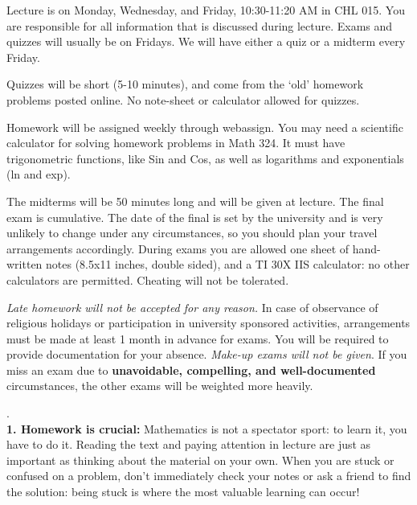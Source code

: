 \documentclass[11 pt]{report}
\begin{document}
\vspace{0.25cm}

  Lecture is on Monday, Wednesday, and Friday, 10:30-11:20 AM in CHL 015.  You
are responsible for all information that is discussed
during lecture. Exams and quizzes will usually be on Fridays. We will have either a quiz or a midterm every Friday. 
\vspace{0.25cm}

 Quizzes will be short (5-10 minutes), and come from the `old' homework problems posted online. No note-sheet or calculator allowed for quizzes. 

\vspace{0.25cm}

  Homework will be assigned weekly through webassign. You may need a scientific calculator for solving homework problems in Math 324.  It must have trigonometric functions, like Sin and Cos, as well as logarithms and exponentials (ln and exp).
\vspace{0.25cm}


  The midterms will be 50 minutes long and
will be given at lecture.  The final exam is cumulative. The date of the final is set by the university and is very unlikely to change under any circumstances, so you should plan your travel arrangements accordingly. During exams you are allowed one 
sheet of hand-written notes (8.5x11 inches, double sided), and a TI 30X IIS calculator: no other calculators are permitted. 
Cheating will not be tolerated. 

\vspace{.25cm}

  \emph{Late homework will not be accepted
for any reason.}  In case of observance of religious holidays or
participation in university sponsored activities, arrangements must
be made at least 1 month in advance for exams. You will be required
to provide documentation for your absence. \emph{Make-up exams will
not be given}.  If you miss an exam due to {\bf unavoidable,
compelling, and well-documented} circumstances, the other exams will
be weighted more heavily. \vspace{0.25cm}

\newpage 

. \\
{\bf1.  Homework is crucial:} Mathematics is not a spectator sport: to learn it, you have to do it.
Reading the text and paying attention in lecture are just as important as thinking about
the material on your own. When you are stuck or confused on a problem, don't immediately check your notes or 
ask a friend to find the solution: being stuck is where the most valuable learning can occur! 
\end{document}
